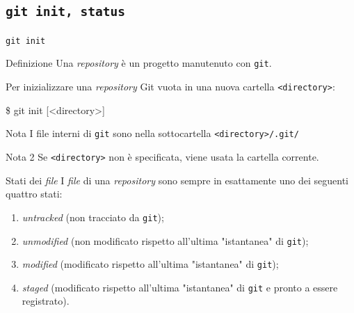 \documentclass{beamer}
\begin{document}
\subsection{\texttt{git init, status}}
\begin{frame}{\texttt{git init}}
  \begin{block}{Definizione}
    Una \emph{repository} è un progetto manutenuto con \texttt{git}.
  \end{block}\pause

  Per inizializzare una \emph{repository} Git vuota in una nuova cartella
  \texttt{<directory>}:
  \begin{semiverbatim}
  \$ git init [<directory>]
  \end{semiverbatim}
  \begin{block}{Nota}
    I file interni di \texttt{git} sono nella sottocartella
    \texttt{<directory>/.git/}
  \end{block}
  \begin{block}{Nota 2}
    Se \texttt{<directory>} non è specificata, viene
    usata la cartella corrente.
  \end{block}
\end{frame}

\begin{frame}{Stati dei \emph{file}}
  I \emph{file} di una \emph{repository} sono sempre in esattamente uno dei
  seguenti quattro stati:
  \begin{enumerate}
    \item<1->\emph{untracked} (non tracciato da \texttt{git});
    \item<2->\emph{unmodified} (non modificato rispetto all'ultima
      "istantanea" di \texttt{git});
    \item<3->\emph{modified} (modificato rispetto all'ultima
      "istantanea" di \texttt{git});
    \item<4->\emph{staged} (modificato rispetto all'ultima "istantanea" di
      \texttt{git} e pronto a essere registrato).
  \end{enumerate}
\end{frame}
\end{document}
